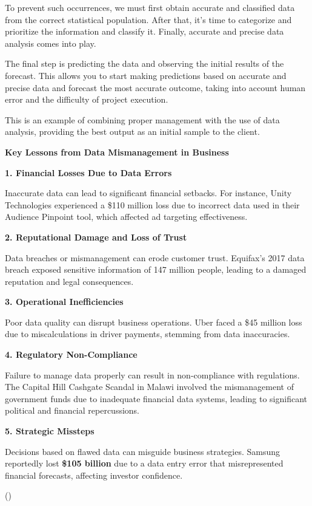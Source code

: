 \documentclass[
  man,
  floatsintext,
  longtable,
  nolmodern,
  notxfonts,
  notimes,
  colorlinks=true,linkcolor=blue,citecolor=blue,urlcolor=blue]{apa7}
\begin{document}
To prevent such occurrences, we must first obtain accurate and
classified data from the correct statistical population. After that,
it's time to categorize and prioritize the information and classify it.
Finally, accurate and precise data analysis comes into play.

The final step is predicting the data and observing the initial results
of the forecast. This allows you to start making predictions based on
accurate and precise data and forecast the most accurate outcome, taking
into account human error and the difficulty of project execution.

This is an example of combining proper management with the use of data
analysis, providing the best output as an initial sample to the client.

\textbf{Key Lessons from Data Mismanagement in Business}

\textbf{1. Financial Losses Due to Data Errors}

Inaccurate data can lead to significant financial setbacks. For
instance, Unity Technologies experienced a \$110 million loss due to
incorrect data used in their Audience Pinpoint tool, which affected ad
targeting effectiveness.

\textbf{2. Reputational Damage and Loss of Trust}

Data breaches or mismanagement can erode customer trust. Equifax's 2017
data breach exposed sensitive information of 147 million people, leading
to a damaged reputation and legal consequences.

\textbf{3. Operational Inefficiencies}

Poor data quality can disrupt business operations. Uber faced a \$45
million loss due to miscalculations in driver payments, stemming from
data inaccuracies.

\textbf{4. Regulatory Non-Compliance}

Failure to manage data properly can result in non-compliance with
regulations. The Capital Hill Cashgate Scandal in Malawi involved the
mismanagement of government funds due to inadequate financial data
systems, leading to significant political and financial repercussions.

\textbf{5. Strategic Missteps}

Decisions based on flawed data can misguide business strategies. Samsung
reportedly lost \textbf{\$105 billion} due to a data entry error that
misrepresented financial forecasts, affecting investor confidence.

()
\end{document}
